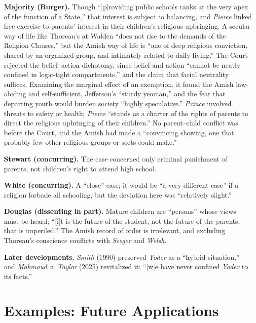 \documentclass[12pt]{article}
\begin{document}
\textbf{Majority (Burger).} Though ``[p]roviding public schools ranks at the very apex of the function of a State,'' that interest is subject to balancing, and \textit{Pierce} linked free exercise to parents' interest in their children's religious upbringing. A secular way of life like Thoreau's at Walden ``does not rise to the demands of the Religion Clauses,'' but the Amish way of life is ``one of deep religious conviction, shared by an organized group, and intimately related to daily living.'' The Court rejected the belief--action dichotomy, since belief and action ``cannot be neatly confined in logic-tight compartments,'' and the claim that facial neutrality suffices. Examining the marginal effect of an exemption, it found the Amish law-abiding and self-sufficient, Jefferson's ``sturdy yeoman,'' and the fear that departing youth would burden society ``highly speculative.'' \textit{Prince} involved threats to safety or health; \textit{Pierce} ``stands as a charter of the rights of parents to direct the religious upbringing of their children.'' No parent--child conflict was before the Court, and the Amish had made a ``convincing showing, one that probably few other religious groups or sects could make.''

\textbf{Stewart (concurring).} The case concerned only criminal punishment of parents, not children's right to attend high school.

\textbf{White (concurring).} A ``close'' case; it would be ``a very different case'' if a religion forbade all schooling, but the deviation here was ``relatively slight.''

\textbf{Douglas (dissenting in part).} Mature children are ``persons'' whose views must be heard; ``[i]t is the future of the student, not the future of the parents, that is imperiled.'' The Amish record of order is irrelevant, and excluding Thoreau's conscience conflicts with \textit{Seeger} and \textit{Welsh}.

\textbf{Later developments.} \textit{Smith} (1990) preserved \textit{Yoder} as a ``hybrid situation,'' and \textit{Mahmoud v. Taylor} (2025) revitalized it: ``[w]e have never confined \emph{Yoder} to its facts.''

\section{Examples: Future Applications}
\end{document}
